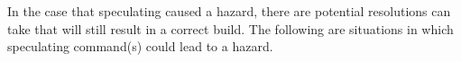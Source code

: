 




In the case that speculating caused a hazard, there are potential resolutions \Rattle can take that will still result in a correct build.  The following are situations in which \Rattle speculating command(s) could lead to a hazard.

